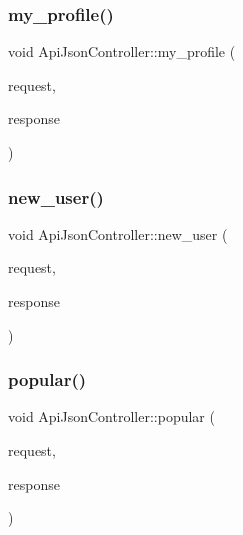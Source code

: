 \mbox{\label{classApiJsonController_aa0ae8d88ab73349b5cbebea85127e485}} 
\subsubsection{\texorpdfstring{my\+\_\+profile()}{my\_profile()}}
{\footnotesize\ttfamily void Api\+Json\+Controller\+::my\+\_\+profile (\begin{DoxyParamCaption}\item[{Mongoose\+::\+Request \&}]{request,  }\item[{Mongoose\+::\+Json\+Response \&}]{response }\end{DoxyParamCaption})}

\mbox{\label{classApiJsonController_a56784a6400512fb7d2cdf499b7f60005}} 
\subsubsection{\texorpdfstring{new\+\_\+user()}{new\_user()}}
{\footnotesize\ttfamily void Api\+Json\+Controller\+::new\+\_\+user (\begin{DoxyParamCaption}\item[{Mongoose\+::\+Request \&}]{request,  }\item[{Mongoose\+::\+Json\+Response \&}]{response }\end{DoxyParamCaption})}

\mbox{\label{classApiJsonController_a4e50d9443193207e630b91bdf5e14e7e}} 
\subsubsection{\texorpdfstring{popular()}{popular()}}
{\footnotesize\ttfamily void Api\+Json\+Controller\+::popular (\begin{DoxyParamCaption}\item[{Mongoose\+::\+Request \&}]{request,  }\item[{Mongoose\+::\+Json\+Response \&}]{response }\end{DoxyParamCaption})}

